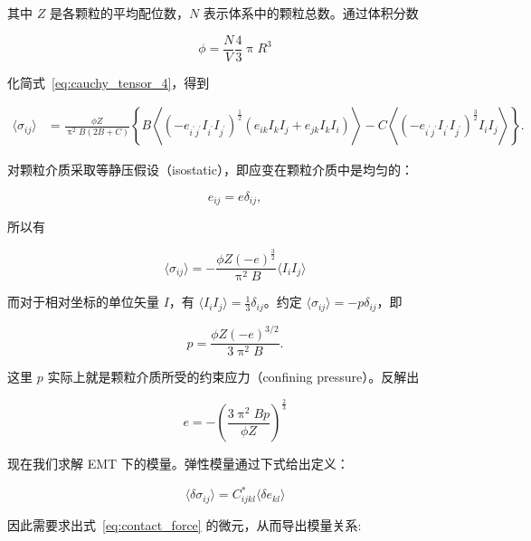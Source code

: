 其中 $Z$ 是各颗粒的平均配位数，$N$ 表示体系中的颗粒总数。通过体积分数

\begin{equation}
  \phi = \frac{N}{V}\frac{4}{3}\uppi R^3
\end{equation}

化简式~\eqref{eq:cauchy_tensor_4}，得到

\begin{equation}
  \begin{aligned}
    \langle\sigma_{ij}\rangle &= \frac{\phi Z}{\uppi^{2}B(2B+C)}\left\{B\left\langle(-e_{i^{\prime}j^{\prime}}I_{i^{\prime}}I_{j^{\prime}})^{\frac{1}{2}}(e_{ik}I_{k}I_{j} + e_{jk}I_{k}I_{i})\right\rangle - C\left\langle(-e_{i^{\prime}j^{\prime}}I_{i^{\prime}}I_{j^{\prime}})^{\frac{3}{2}}I_{i}I_{j}\right\rangle\right\}.
  \end{aligned}
\end{equation}

对颗粒介质采取等静压假设（isostatic），即应变在颗粒介质中是均匀的：

\begin{equation}
  e_{ij} = e\delta_{ij},
\end{equation}

所以有

\begin{equation}
  \langle\sigma_{ij}\rangle = -\frac{\phi Z(-e)^{\frac{3}{2}}}{\uppi^{2}B}\langle I_{i}I_{j}\rangle
\end{equation}

而对于相对坐标的单位矢量 $I$，有 $\langle I_{i}I_{j}\rangle = \frac{1}{3}\delta_{ij}$。约定 $\langle\sigma_{ij}\rangle = -p\delta_{ij}$，即

\begin{equation}
  p = \frac{\phi Z(-e)^{3/2}}{3\uppi^{2}B}.
\end{equation}

这里 $p$ 实际上就是颗粒介质所受的约束应力（confining pressure）。反解出

\begin{equation}
  e = -\left(\frac{3\uppi^{2}Bp}{\phi Z}\right)^{\frac{2}{3}}
\end{equation}

现在我们求解 EMT 下的模量。弹性模量通过下式给出定义：

\begin{equation}
  \langle\delta\sigma_{ij}\rangle = C_{ijkl}^{*}\langle\delta e_{kl}\rangle
\end{equation}

因此需要求出式~\eqref{eq:contact_force} 的微元，从而导出模量关系:

